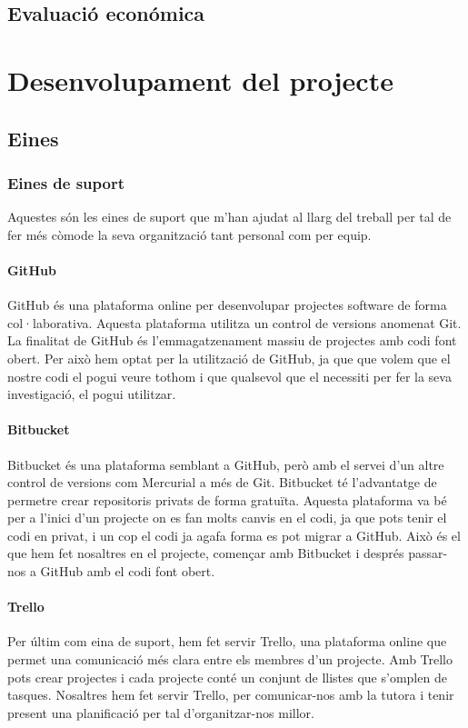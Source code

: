 \documentclass[12pt,a4paper,catalan]{article}
\begin{document}
\subsection{Evaluació económica}
\newpage

\section{Desenvolupament del projecte}
\subsection{Eines}
\subsubsection{Eines de suport}
Aquestes són les eines de suport que m'han ajudat al llarg del treball per tal de fer més còmode la seva organització tant personal com per equip.

\paragraph{GitHub}
GitHub és una plataforma online per desenvolupar projectes software de forma col·laborativa. Aquesta plataforma utilitza un control de versions anomenat Git. La finalitat de GitHub és l'emmagatzenament massiu de projectes amb codi font obert. Per això hem optat per la utilització de GitHub, ja que que volem que el nostre codi el pogui veure tothom i que qualsevol que el necessiti per fer la seva investigació, el pogui utilitzar.

\paragraph{Bitbucket}
Bitbucket és una plataforma semblant a GitHub, però amb el servei d'un altre control de versions com Mercurial a més de Git. Bitbucket té l'advantatge de permetre crear repositoris privats de forma gratuïta. Aquesta plataforma va bé per a l'inici d'un projecte on es fan molts canvis en el codi, ja que pots tenir el codi en privat, i un cop el codi ja agafa forma es pot migrar a GitHub. Això és el que hem fet nosaltres en el projecte, començar amb Bitbucket i després passar-nos a GitHub amb el codi font obert.

\paragraph{Trello}
Per últim com eina de suport, hem fet servir Trello, una plataforma online que permet una comunicació més clara entre els membres d'un projecte. Amb Trello pots crear projectes i cada projecte conté un conjunt de llistes que s'omplen de tasques. Nosaltres hem fet servir Trello, per comunicar-nos amb la tutora i tenir present una planificació per tal d'organitzar-nos millor.
\end{document}
